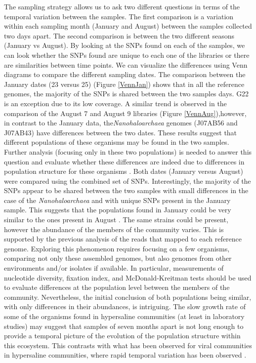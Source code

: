 The sampling strategy allows us to ask two different questions in terms of the temporal variation between the samples. The first comparison is a variation within each sampling month (January and August) between the samples collected two days apart. The second comparison is between the two different seasons (January vs August). By looking at the SNPs found on each of the samples, we can look whether the SNPs found are unique to each one of the libraries or there are similarities between time points. We can visualize the differences using Venn diagrams to compare the different sampling dates. The comparison between the January dates (23 versus 25) (Figure \ref{VennJan}) shows that in all the reference genomes, the majority of the SNPs is shared between the two samples days. G22 is an exception due to its low coverage. A similar trend is observed in the comparison of the August 7 and August 9 libraries (Figure \ref{VennAug}),however, in contrast to the January data, the\textit{Nanohaloarchaea} genomes (J07AB56 and J07AB43) have differences between the two dates. These results suggest that different populations of these organisms may be found in the two samples. Further analysis (focusing only in these two populations) is needed to answer this question and evaluate whether these differences are indeed due to differences in population structure for these organisms \cite{Schloissnig:2012hx,Shapiro:hi,Vos:2011ux}. Both dates (January versus August) were compared using the combined set of SNPs. Interestingly, the majority of the SNPs appear to be shared between the two samples with small differences in the case of the \textit{Nanohaloarchaea} and with unique SNPs present in the January sample. This suggests that the populations found in January could be very similar to the ones present in August \cite{Doolittle:2012hf}. The same strains could be present, however the abundance of the members of the community varies. This is supported by the previous analysis of the reads that mapped to each reference genome. Exploring this phenomenon requires focusing on a few organisms, comparing not only these assembled genomes, but also genomes from other environments and/or isolates if available. In particular, measurements of nucleotide diversity, fixation index, and McDonald-Kreitman tests \cite{Schloissnig:2012hx,Simmons:2008by} should be used to evaluate differences at the population level between the members of the community. Nevertheless, the initial conclusion of both populations being similar, with only differences in their abundances, is intriguing. The slow growth rate of some of the organisms found in hypersaline communities \cite{DyallSmith:2011tu} (at least in laboratory studies) may suggest that samples of seven months apart is not long enough to provide a temporal picture of the evolution of the population structure within this ecosystem. This contrasts with what has been observed for viral communities in hypersaline communities, where rapid temporal variation has been observed  \cite{RodriguezBrito:2010in,Emerson:2012gh}.

